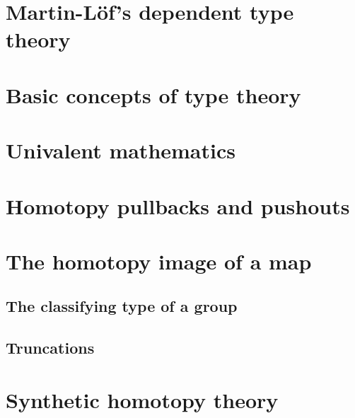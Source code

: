 \documentclass[11pt]{memoir} %
\begin{document}
\mainmatter

\renewcommand{\thechapter}{\Roman{chapter}}

\chapter{Martin-L\"of's dependent type theory}







%

\chapter{Basic concepts of type theory}





\chapter{Univalent mathematics}






\chapter{Homotopy pullbacks and pushouts}






\chapter{The homotopy image of a map}




\section{The classifying type of a group}

\section{Truncations}

\chapter{Synthetic homotopy theory}






%

\backmatter

\printbibliography

\printindex
\end{document}
